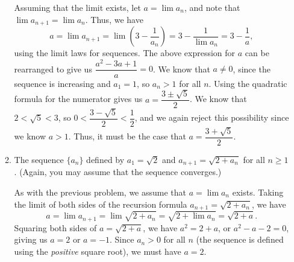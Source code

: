 \documentclass[12pt]{article}
\begin{document}
\begin{enumerate}
\begin{enumerate}
 Assuming that the limit exists, let $a=\lim a_n$, and note that $\lim a_{n+1} = \lim a_n$. Thus, we have
 \[
 a = \lim a_{n+1} = \lim \left(3-\frac{1}{a_n}\right) = 3-\frac{1}{\lim a_n} = 3-\frac{1}{a},
 \]
 using the limit laws for sequences. The above expression for $a$ can be rearranged to give us $\dfrac{a^2-3a+1}{a}=0$. We know that $a\neq 0$, since the sequence is increasing and $a_1=1$, so $a_n>1$ for all $n$. Using the quadratic formula for the numerator gives us $a = \dfrac{3\pm \sqrt{5}}{2}$. We know that $2<\sqrt{5}<3$, so $0<\dfrac{3-\sqrt{5}}{2}<\dfrac{1}{2}$, and we again reject this possibility since we know $a>1$. Thus, it must be the case that $a = \dfrac{3+\sqrt{5}}{2}$.

 \item The sequence $\{a_n\}$ defined by $a_1 = \sqrt{2}$ and $a_{n+1} = \sqrt{2+a_n}$ for all $n\geq 1$. (Again, you may assume that the sequence converges.)
 
 \bigskip
 
 As with the previous problem, we assume that $a=\lim a_n$ exists. Taking the limit of both sides of the recursion formula $a_{n+1} = \sqrt{2+a_n}$, we have
 \[
 a = \lim a_{n+1} = \lim \sqrt{2+a_n} = \sqrt{2+\lim a_n} = \sqrt{2+a}.
 \]
 Squaring both sides of $a=\sqrt{2+a}$, we have $a^2 = 2+a$, or $a^2-a-2=0$, giving us $a=2$ or $a=-1$. Since $a_n>0$ for all $n$ (the sequence is defined using the \textit{positive} square root), we must have $a=2$.
\end{enumerate}



\end{enumerate}
\end{document}
